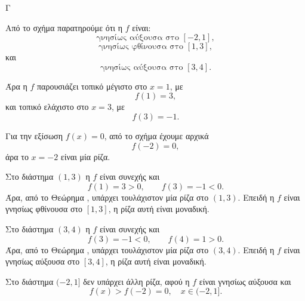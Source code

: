 
\begin{thema}{Γ}

\begin{center}
\end{center}

\begin{erwthma}
\item Από το σχήμα παρατηρούμε ότι η $f$ είναι:
\[
\text{γνησίως αύξουσα στο }[-2,1],
\]
\[
\text{γνησίως φθίνουσα στο }[1,3],
\]
και
\[
\text{γνησίως αύξουσα στο }[3,4].
\]

Άρα η $f$ παρουσιάζει τοπικό μέγιστο στο $x=1$, με
\[
f(1)=3,
\]
και τοπικό ελάχιστο στο $x=3$, με
\[
f(3)=-1.
\]

Για την εξίσωση $f(x)=0$, από το σχήμα έχουμε αρχικά
\[
f(-2)=0,
\]
άρα το $x=-2$ είναι μία ρίζα.

Στο διάστημα $(1,3)$ η $f$ είναι συνεχής και
\[
f(1)=3>0,\qquad f(3)=-1<0.
\]
Άρα, από το Θεώρημα , υπάρχει τουλάχιστον μία ρίζα στο $(1,3)$. Επειδή η $f$ είναι γνησίως φθίνουσα στο $[1,3]$, η ρίζα αυτή είναι μοναδική.

Στο διάστημα $(3,4)$ η $f$ είναι συνεχής και
\[
f(3)=-1<0,\qquad f(4)=1>0.
\]
Άρα, από το Θεώρημα , υπάρχει τουλάχιστον μία ρίζα στο $(3,4)$. Επειδή η $f$ είναι γνησίως αύξουσα στο $[3,4]$, η ρίζα αυτή είναι μοναδική.

Στο διάστημα $(-2,1]$ δεν υπάρχει άλλη ρίζα, αφού η $f$ είναι γνησίως αύξουσα και
\[
f(x)>f(-2)=0,\quad x\in(-2,1].
\]


\end{erwthma}
\end{thema}
